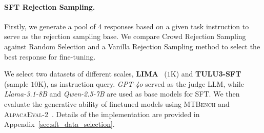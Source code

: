 \paragraph{SFT Rejection Sampling.} Firstly, we generate a pool of 4 responses based on a given task instruction to serve as the rejection sampling base. We compare Crowd Rejection Sampling against Random Selection and a Vanilla Rejection Sampling method to select the best response for fine-tuning.


We select two datasets of different scales, \textbf{LIMA}~\citep{zhou2023lima} ($1$K) and \textbf{TULU3-SFT}~\citep{lambert2025tulu3} (sample $10$K), as instruction query. \textit{GPT-4o} served as the judge LLM, while \textit{Llama-3.1-8B} and \textit{Qwen-2.5-7B} are used as base models for SFT. We then evaluate the generative ability of finetuned models using \textsc{MTBench} and \textsc{AlpacaEval-2}~\citep{dubois2024lengthcontrolled}. Details of the implementation are provided in Appendix~\ref{sec:sft_data_selection}.


